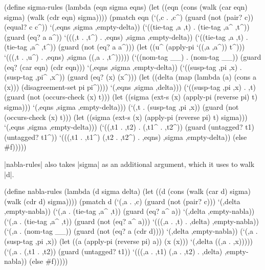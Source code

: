 \schemedisplayspace
\begin{schemedisplay}
(define sigma-rules  
  (lambda (eqn sigma eqns)
    (let ((eqn (cons (walk (car eqn) sigma) (walk (cdr eqn) sigma))))
      (pmatch eqn
        (`(,c . ,c^)
         (guard (not (pair? c)) (equal? c c^))
         `(,eqns ,sigma ,empty-delta))
        (`((tie-tag ,a ,t) . (tie-tag ,a^ ,t^))
         (guard (eq? a a^))
         `(((,t . ,t^) . ,eqns) ,sigma ,empty-delta))
        (`((tie-tag ,a ,t) . (tie-tag ,a^ ,t^))
         (guard (not (eq? a a^)))
         (let ((u^ (apply-pi `((,a ,a^)) t^)))
           `(((,t . ,u^) . ,eqns) ,sigma ((,a . ,t^)))))
        (`((nom-tag __) . (nom-tag __))
         (guard (eq? (car eqn) (cdr eqn)))
         `(,eqns ,sigma ,empty-delta))
        (`((susp-tag ,pi ,x) . (susp-tag ,pi^ ,x^))
         (guard (eq? (x) (x^)))
         (let ((delta (map (lambda (a) (cons a (x))) 
                           (disagreement-set pi pi^))))
           `(,eqns ,sigma ,delta)))
        (`((susp-tag ,pi ,x) . ,t)
         (guard (not (occurs-check (x) t)))
         (let ((sigma (ext-s (x) (apply-pi (reverse pi) t) sigma)))
           `(,eqns ,sigma ,empty-delta)))
        (`(,t . (susp-tag ,pi ,x))
         (guard (not (occurs-check (x) t)))
         (let ((sigma (ext-s (x) (apply-pi (reverse pi) t) sigma)))
           `(,eqns ,sigma ,empty-delta)))
        (`((,t1 . ,t2) . (,t1^ . ,t2^))
         (guard (untagged? t1) (untagged? t1^))
         `(((,t1 . ,t1^) (,t2 . ,t2^) . ,eqns) ,sigma ,empty-delta))
        (else #f)))))
\end{schemedisplay}

\newpage

\scheme|nabla-rules| also takes \scheme|sigma| as an additional
argument, which it uses to walk \scheme|d|.

\schemedisplayspace
\begin{schemedisplay}
(define nabla-rules
  (lambda (d sigma delta)
    (let ((d (cons (walk (car d) sigma) (walk (cdr d) sigma))))
      (pmatch d
        (`(,a . ,c)
         (guard (not (pair? c)))
         `(,delta ,empty-nabla))
        (`(,a . (tie-tag ,a^ ,t))
         (guard (eq? a^ a))
         `(,delta ,empty-nabla))
        (`(,a . (tie-tag ,a^ ,t))
         (guard (not (eq? a^ a)))
         `(((,a . ,t) . ,delta) ,empty-nabla))
        (`(,a . (nom-tag __))
         (guard (not (eq? a (cdr d))))
         `(,delta ,empty-nabla))
        (`(,a . (susp-tag ,pi ,x))
         (let ((a (apply-pi (reverse pi) a)) (x (x)))
           `(,delta ((,a . ,x)))))
        (`(,a . (,t1 . ,t2))
         (guard (untagged? t1))
         `(((,a . ,t1) (,a . ,t2) . ,delta) ,empty-nabla))
        (else #f)))))
\end{schemedisplay}

